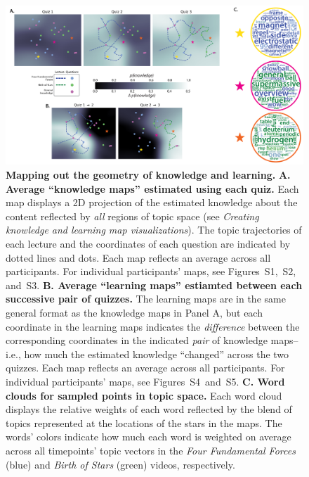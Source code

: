 \documentclass[10pt]{article}
\newcommand{\individualKnowledgeMapsA}{S1}
\newcommand{\individualKnowledgeMapsB}{S2}
\newcommand{\individualKnowledgeMapsC}{S3}
\newcommand{\individualLearningMapsA}{S4}
\newcommand{\individualLearningMapsB}{S5}
\begin{document}
\begin{figure}[tp]
    \centering
    \includegraphics[width=\textwidth]{figs/knowledge_and_learning_maps}
    
    \caption{\textbf{Mapping out the geometry of knowledge and learning.}
    \textbf{A. Average ``knowledge maps'' estimated using each quiz.} Each map
    displays a 2D projection of the estimated knowledge about the content
    reflected by \textit{all} regions of topic space (see \textit{Creating
    knowledge and learning map visualizations}). The topic trajectories of each
    lecture and the coordinates of each question are indicated by dotted lines
    and dots. Each map reflects an average across all participants. For
    individual participants' maps, see
    Figures~\individualKnowledgeMapsA,~\individualKnowledgeMapsB,
    and~\individualKnowledgeMapsC. \textbf{B. Average ``learning maps''
    estiamted between each successive pair of quizzes.} The learning maps are
    in the same general format as the knowledge maps in Panel A, but each
    coordinate in the learning maps indicates the \textit{difference} between
    the corresponding coordinates in the indicated \textit{pair} of knowledge
    maps-- i.e., how much the estimated knowledge ``changed'' across the two
    quizzes. Each map reflects an average across all participants. For
    individual participants' maps, see
    Figures~\individualLearningMapsA~and~\individualLearningMapsB. \textbf{C.
    Word clouds for sampled points in topic space.} Each word cloud displays
    the relative weights of each word reflected by the blend of topics
    represented at the locations of the stars in the maps. The words' colors
    indicate how much each word is weighted on average across all timepoints'
    topic vectors in the \textit{Four Fundamental Forces} (blue) and
    \textit{Birth of Stars} (green) videos, respectively.}
    
    \label{fig:knowledge-maps}
    \end{figure}
\end{document}

